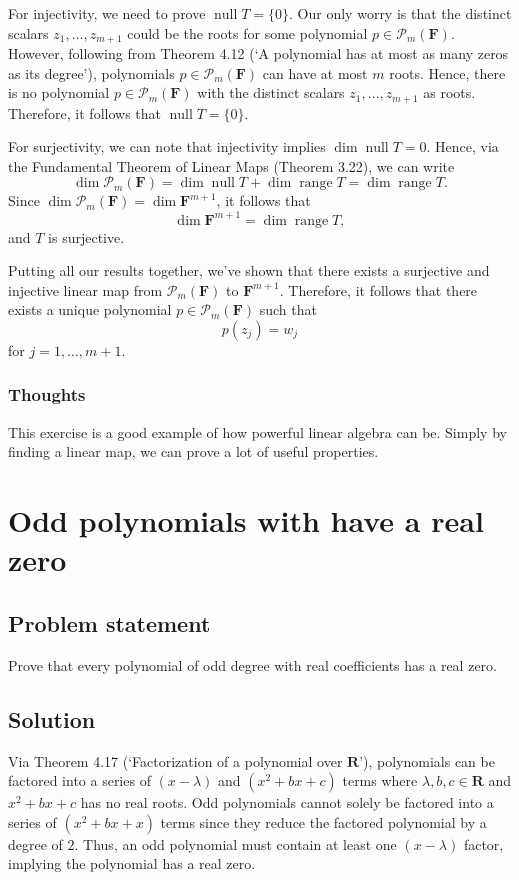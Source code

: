 \documentclass{article}
\begin{document}
For injectivity, we need to prove $\operatorname{null}T=\{0\}$. 
Our only worry is that the distinct scalars $z_1,\ldots,z_{m+1}$ could be the roots for some polynomial $p\in\mathcal{P}_m(\mathbf{F})$. 
However, following from Theorem 4.12 (`A polynomial has at most as many zeros as its degree'), polynomials $p\in\mathcal{P}_m(\mathbf{F})$ can have at most $m$ roots. 
Hence, there is no polynomial $p\in\mathcal{P}_m(\mathbf{F})$ with the distinct scalars $z_1,\ldots,z_{m+1}$ as roots. 
Therefore, it follows that $\operatorname{null}T=\{0\}$.

For surjectivity, we can note that injectivity implies $\dim \operatorname{null}T=0$. 
Hence, via the Fundamental Theorem of Linear Maps (Theorem 3.22), we can write
\[\dim \mathcal{P}_m(\mathbf{F})=\dim \operatorname{null}T+\dim \operatorname{range}T=\dim \operatorname{range}T.\]
Since $\dim \mathcal{P}_m(\mathbf{F})=\dim \mathbf{F}^{m+1}$, it follows that 
\[\dim \mathbf{F}^{m+1}=\dim \operatorname{range}T,\]
and $T$ is surjective.

Putting all our results together, we've shown that there exists a surjective and injective linear map from $\mathcal{P}_m(\mathbf{F})$ to $\mathbf{F}^{m+1}$. 
Therefore, it follows that there exists a unique polynomial $p\in\mathcal{P}_m(\mathbf{F})$ such that
\[p(z_j)=w_j\]
for $j=1,\ldots,m+1$.

\subsubsection*{Thoughts}
This exercise is a good example of how powerful linear algebra can be. 
Simply by finding a linear map, we can prove a lot of useful properties.

\clearpage

\renewcommand{\thesection}{7}
\section{Odd polynomials with have a real zero}
\subsection*{Problem statement}
Prove that every polynomial of odd degree with real coefficients has a real zero.

\subsection*{Solution}
Via Theorem 4.17 (`Factorization of a polynomial over $\mathbf{R}$'), polynomials can be factored into a series of $(x-\lambda)$ and $(x^2+bx+c)$ terms where $\lambda,b,c\in\mathbf{R}$ and $x^2+bx+c$ has no real roots. 
Odd polynomials cannot solely be factored into a series of $(x^2+bx+x)$ terms since they reduce the factored polynomial by a degree of $2$. 
Thus, an odd polynomial must contain at least one $(x-\lambda)$ factor, implying the polynomial has a real zero.
\end{document}
